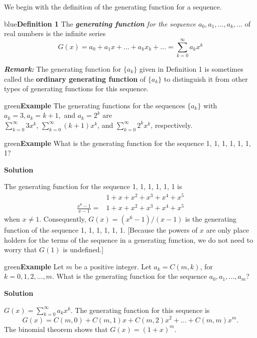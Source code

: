 \documentclass[11pt]{article}
\newenvironment{example}[1][\unskip]{\begin{mybox}{green}{\textbf{Example} {#1}}}{\end{mybox}}
\newenvironment{definition}[1]{\begin{mybox}{blue}{\textbf{Definition #1}}}{\end{mybox}}
\begin{document}
We begin with the definition of the generating function for a sequence.

\begin{definition}{1}
The \textit{\textbf{generating function} for the sequence $a_0, a_1, ..., a_k, ...$} of real numbers is the infinite series
\begin{equation*}
    G(x) = a_0 + a_1x + ... + a_kx_k + ... = \sum_{k=0}^{\infty} a_kx^k
\end{equation*}
\end{definition}

\textbf{\textit{Remark:}} The generating function for $\{a_k\}$ given in Definition 1 is sometimes called the \textbf{ordinary generating function} of $\{a_k\}$ to distinguish it from other types of generating functions for this sequence.


\begin{example}
The generating functions for the sequences $\{a_k\}$ with $a_k = 3, a_k = k + 1,$ and $a_k = 2^k$ are \\
$\sum_{k=0}^{\infty} 3x^k$, $\sum_{k=0}^{\infty} (k+1)x^k$, and $\sum_{k=0}^{\infty} 2^kx^k$, respectively.
\end{example}

\begin{example}
What is the generating function for the sequence 1, 1, 1, 1, 1, 1, 1?

\textbf{Solution}

The generating function for the sequence 1, 1, 1, 1, 1, 1 is
\begin{align*}
    &1 + x + x^2 + x^3 + x^4 + x^5\\
    \frac{x^6 - 1}{x-1} = &1 + x + x^2 + x^3 + x^4 +x^5
\end{align*}
when $x \neq 1$. Consequently, $G(x) = (x^6-1)/(x-1)$ is the generating function of the sequence 1, 1, 1, 1, 1, 1. [Because the powers of $x$ are only place holders for the terms of the sequence in a generating function, we do not need to worry that $G(1)$ is undefined.]
\end{example}

\begin{example}
Let $m$ be a positive integer. Let $a_k = C(m, k)$, for $k = 0, 1, 2, ..., m$. What is the generating function for the sequence $a_0, a_1, ..., a_m$?

\textbf{Solution}

$G(x) = \sum_{k=0}^{\infty} a_kx^k$. The generating function for this sequence is
\begin{equation*}
    G(x) = C(m, 0) + C(m, 1)x + C(m, 2)x^2 + ... + C(m,m)x^m.    
\end{equation*}
The binomial theorem shows that $G(x) = (1 + x)^m$.
\end{example}
\end{document}
